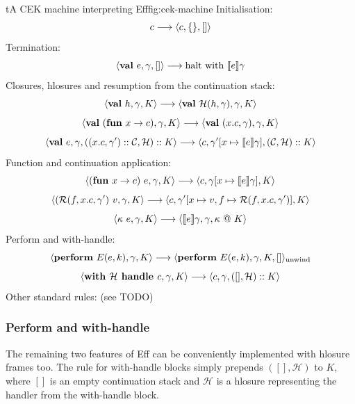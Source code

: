 \documentclass[class=article, crop=false]{standalone}
\begin{document}
\begin{myfigure}[0.9]{t}{A CEK machine interpreting Eff}{fig:cek-machine}
    Initialisation:
    $$ c \longrightarrow \langle c, \{\}, [] \rangle $$
    Termination:
    $$ \langle  \mathbf{val}\  e, \gamma, []  \rangle \longrightarrow \text{halt with } \llbracket e \rrbracket\gamma$$
    Closures, hlosures and resumption from the continuation stack:
    $$ \langle  \mathbf{val}\  h, \gamma, K \rangle \longrightarrow \langle \mathbf{val}\  \mathcal{H}(h, \gamma), \gamma, K \rangle $$
    $$ \langle  \mathbf{val}\  (\mathbf{fun}\  x \to c), \gamma, K \rangle \longrightarrow \langle \mathbf{val}\  (x.c, \gamma), \gamma, K  \rangle $$
    $$ \langle  \mathbf{val}\  e, \gamma, ((x.c, \gamma') :: \mathcal{C}, \mathcal{H}) :: K  \rangle \longrightarrow
        \langle c, \gamma'[x \mapsto \llbracket e \rrbracket\gamma], (\mathcal{C}, \mathcal{H}) :: K \rangle $$
    Function and continuation application:
    $$ \langle  (\mathbf{fun}\  x \to c)\ e, \gamma, K \rangle \longrightarrow \langle c, \gamma[x \mapsto \llbracket e \rrbracket\gamma], K  \rangle $$
    $$ \langle  (\mathcal{R}(f, x.c, \gamma')\ v, \gamma, K \rangle \longrightarrow \langle c, \gamma'[x \mapsto v, f \mapsto \mathcal{R}(f, x.c, \gamma')], K  \rangle $$
    $$ \langle \kappa\ e, \gamma, K  \rangle \longrightarrow \langle  \llbracket e \rrbracket \gamma, \gamma, \kappa\ @\ K  \rangle $$
    Perform and with-handle:
    $$ \langle  \mathbf{perform}\  E(e,k), \gamma, K  \rangle \longrightarrow \langle  \mathbf{perform}\  E(e,k), \gamma, K, []  \rangle_{\text{unwind}} $$
    $$ \langle  \textbf{with } \mathcal{H} \textbf{ handle } c, \gamma, K  \rangle \longrightarrow \langle  c, \gamma, ([], \mathcal{H}) :: K  \rangle $$
    Other standard rules: (see TODO)
\end{myfigure}

\subsubsection{Perform and with-handle}

The remaining two features of Eff can be conveniently implemented with hlosure
frames too. The rule for with-handle blocks simply prepends $([], \mathcal{H})$
to $K$, where $[]$ is an empty continuation stack and $\mathcal{H}$ is a
hlosure representing the handler from the with-handle block.
\end{document}
